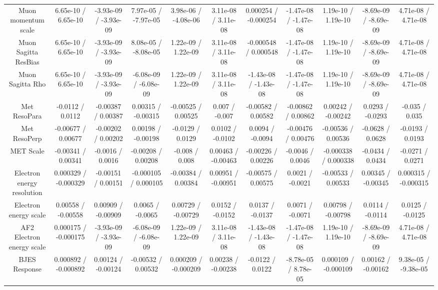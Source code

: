 \begin{table}[htbp]
\begin{center}
\begin{tabular}{|c|c|c|c|c|c|c|c|c|c|c|}
  Muon momentum scale & 6.65e-10 / 6.65e-10 & -3.93e-09 / -3.93e-09 & 7.97e-05 / -7.97e-05 & 3.98e-06 / -4.08e-06 & 3.11e-08 / 3.11e-08 & 0.000254 / -0.000254 & -1.47e-08 / -1.47e-08 & 1.19e-10 / 1.19e-10 & -8.69e-09 / -8.69e-09 & 4.71e-08 / 4.71e-08 \\ 
  Muon Sagitta ResBias & 6.65e-10 / 6.65e-10 & -3.93e-09 / -3.93e-09 & 8.08e-05 / -8.08e-05 & 1.22e-09 / 1.22e-09 & 3.11e-08 / 3.11e-08 & -0.000548 / 0.000548 & -1.47e-08 / -1.47e-08 & 1.19e-10 / 1.19e-10 & -8.69e-09 / -8.69e-09 & 4.71e-08 / 4.71e-08 \\ 
  Muon Sagitta Rho & 6.65e-10 / 6.65e-10 & -3.93e-09 / -3.93e-09 & -6.08e-09 / -6.08e-09 & 1.22e-09 / 1.22e-09 & 3.11e-08 / 3.11e-08 & -1.43e-08 / -1.43e-08 & -1.47e-08 / -1.47e-08 & 1.19e-10 / 1.19e-10 & -8.69e-09 / -8.69e-09 & 4.71e-08 / 4.71e-08 \\ 
  Met ResoPara & -0.0112 / 0.0112 & -0.00387 / 0.00387 & 0.00315 / -0.00315 & -0.00525 / 0.00525 & 0.007 / -0.007 & -0.00582 / 0.00582 & -0.00862 / 0.00862 & 0.00242 / -0.00242 & 0.0293 / -0.0293 & -0.035 / 0.035 \\ 
  Met ResoPerp & -0.00677 / 0.00677 & -0.00202 / 0.00202 & 0.00198 / -0.00198 & -0.0129 / 0.0129 & 0.0102 / -0.0102 & 0.0094 / -0.0094 & -0.00476 / 0.00476 & -0.00536 / 0.00536 & -0.0628 / 0.0628 & -0.0193 / 0.0193 \\ 
  MET Scale & -0.00341 / 0.00341 & -0.0016 / 0.0016 & -0.00208 / 0.00208 & -0.008 / 0.008 & 0.00463 / -0.00463 & -0.00226 / 0.00226 & -0.0046 / 0.0046 & -0.000338 / 0.000338 & -0.0434 / 0.0434 & -0.0271 / 0.0271 \\ 
  Electron energy resolution & 0.000329 / -0.000329 & -0.00151 / 0.00151 & -0.000105 / 0.000105 & -0.00384 / 0.00384 & 0.00951 / -0.00951 & -0.00575 / 0.00575 & 0.0021 / -0.0021 & -0.00533 / 0.00533 & 0.00345 / -0.00345 & 0.000315 / -0.000315 \\ 
  Electron energy scale & 0.00558 / -0.00558 & 0.00909 / -0.00909 & 0.0065 / -0.0065 & 0.00729 / -0.00729 & 0.0152 / -0.0152 & 0.0137 / -0.0137 & 0.0071 / -0.0071 & 0.00798 / -0.00798 & 0.0114 / -0.0114 & 0.0125 / -0.0125 \\ 
  AF2 Electron energy scale & 0.000175 / -0.000175 & -3.93e-09 / -3.93e-09 & -6.08e-09 / -6.08e-09 & 1.22e-09 / 1.22e-09 & 3.11e-08 / 3.11e-08 & -1.43e-08 / -1.43e-08 & -1.47e-08 / -1.47e-08 & 1.19e-10 / 1.19e-10 & -8.69e-09 / -8.69e-09 & 4.71e-08 / 4.71e-08 \\ 
  BJES Response & 0.000892 / -0.000892 & 0.00124 / -0.00124 & -0.00532 / 0.00532 & 0.000209 / -0.000209 & 0.00238 / -0.00238 & -0.0122 / 0.0122 & -8.78e-05 / 8.78e-05 & 0.000109 / -0.000109 & 0.00162 / -0.00162 & 9.38e-05 / -9.38e-05 \\ 

\end{tabular}
\end{center}
\end{table}

